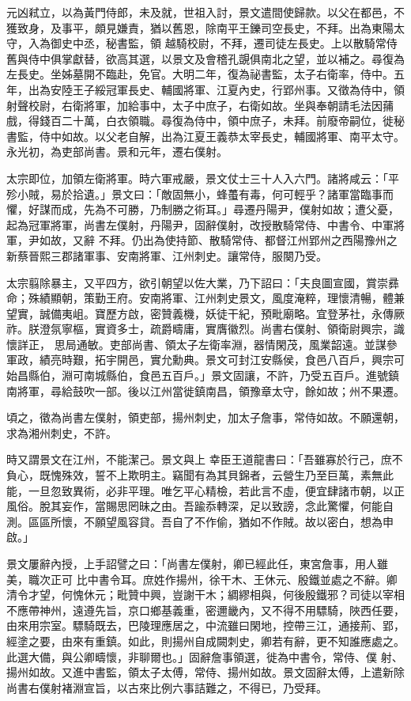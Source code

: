 \begin{pinyinscope}
 元凶弒立，以為黃門侍郎，未及就，世祖入討，景文遣間使歸款。以父在都邑，不獲致身，及事平，頗見嫌責，猶以舊恩，除南平王鑠司空長史，不拜。出為東陽太守，入為御史中丞，秘書監，領
 越騎校尉，不拜，遷司徒左長史。上以散騎常侍舊與侍中俱掌獻替，欲高其選，以景文及會稽孔覬俱南北之望，並以補之。尋復為左長史。坐姊墓開不臨赴，免官。大明二年，復為祕書監，太子右衛率，侍中。五年，出為安陸王子綏冠軍長史、輔國將軍、江夏內史，行郢州事。又徵為侍中，領射聲校尉，右衛將軍，加給事中，太子中庶子，右衛如故。坐與奉朝請毛法因蒱戲，得錢百二十萬，白衣領職。尋復為侍中，領中庶子，未拜。前廢帝嗣位，徙秘
 書監，侍中如故。以父老自解，出為江夏王義恭太宰長史，輔國將軍、南平太守。永光初，為吏部尚書。景和元年，遷右僕射。



 太宗即位，加領左衛將軍。時六軍戒嚴，景文仗士三十人入六門。諸將咸云：「平殄小賊，易於拾遺。」景文曰：「敵固無小，蜂蠆有毒，何可輕乎？諸軍當臨事而懼，好謀而成，先為不可勝，乃制勝之術耳。」尋遷丹陽尹，僕射如故；遭父憂，起為冠軍將軍，尚書左僕射，丹陽尹，固辭僕射，改授散騎常侍、中書令、中軍將軍，尹如故，又辭
 不拜。仍出為使持節、散騎常侍、都督江州郢州之西陽豫州之新蔡晉熙三郡諸軍事、安南將軍、江州刺史。讓常侍，服闋乃受。



 太宗翦除暴主，又平四方，欲引朝望以佐大業，乃下詔曰：「夫良圖宣國，賞崇彞命；殊績顯朝，策勤王府。安南將軍、江州刺史景文，風度淹粹，理懷清暢，體兼望實，誠備夷岨。寶歷方啟，密贊義機，妖徒干紀，預毗廟略。宜登茅社，永傳厥祚。朕澄氛寧樞，實資多士，疏爵疇庸，實膺徽烈。尚書右僕射、領衛尉興宗，識懷詳正，
 思局通敏。吏部尚書、領太子左衛率淵，器情閑茂，風業韶遠。並謀參軍政，績亮時艱，拓宇開邑，實允勳典。景文可封江安縣侯，食邑八百戶，興宗可始昌縣伯，淵可南城縣伯，食邑五百戶。」景文固讓，不許，乃受五百戶。進號鎮南將軍，尋給鼓吹一部。後以江州當徙鎮南昌，領豫章太守，餘如故；州不果遷。



 頃之，徵為尚書左僕射，領吏部，揚州刺史，加太子詹事，常侍如故。不願還朝，求為湘州刺史，不許。



 時又謂景文在江州，不能潔己。景文與上
 幸臣王道龍書曰：「吾雖寡於行己，庶不負心，既愧殊效，誓不上欺明主。竊聞有為其貝錦者，云營生乃至巨萬，素無此能，一旦忽致異術，必非平理。唯乞平心精檢，若此言不虛，便宜肆諸市朝，以正風俗。脫其妄作，當賜思罔昧之由。吾踰忝轉深，足以致謗，念此驚懼，何能自測。區區所懷，不願望風容貸。吾自了不作偷，猶如不作賊。故以密白，想為申啟。」



 景文屢辭內授，上手詔譬之曰：「尚書左僕射，卿已經此任，東宮詹事，用人雖美，職次正可
 比中書令耳。庶姓作揚州，徐干木、王休元、殷鐵並處之不辭。卿清令才望，何愧休元；毗贊中興，豈謝干木；綢繆相與，何後殷鐵邪？司徒以宰相不應帶神州，遠遵先旨，京口鄉基義重，密邇畿內，又不得不用驃騎，陜西任要，由來用宗室。驃騎既去，巴陵理應居之，中流雖曰閑地，控帶三江，通接荊、郢，經塗之要，由來有重鎮。如此，則揚州自成闕刺史，卿若有辭，更不知誰應處之。此選大備，與公卿疇懷，非聊爾也。」固辭詹事領選，徙為中書令，常侍、僕
 射、揚州如故。又進中書監，領太子太傅，常侍、揚州如故。景文固辭太傅，上遣新除尚書右僕射褚淵宣旨，以古來比例六事詰難之，不得已，乃受拜。




\end{pinyinscope}
